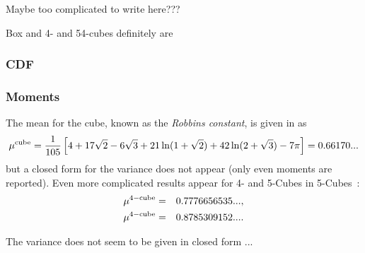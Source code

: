 Maybe too complicated to write here???

Box and 4- and 54-cubes definitely are


\subsubsection{CDF}


\subsubsection{Moments}

The mean for the cube, known as the {\em Robbins constant}, is given
in \cite{robbins78:_constant,weisstein:_cube_line_picking} as
\begin{equation}
   \label{eq:cube_mean}
 \mu^{\rm cube} = \frac{1}{105} \left[ 
                             4 + 17 \sqrt{2}- 6 \sqrt{3}  +
                             21 \ln(1+\sqrt{2}) + 
                             42 \ln(2+\sqrt{3}) - 7 \pi
                      \right]
	=	0.66170...
\end{equation}
but a closed form for the variance does not appear (only even moments
are reported). Even more complicated results appear for 4- and 5-Cubes in
5-Cubes~\cite{philip:_probab_distr_distan_between_two_4d}:
\begin{eqnarray}
 \mu^{\rm 4-cube} & = & 0.7776656535 ...    \label{eq:4-cube}, \\
 \mu^{\rm 4-cube} & = & 0.8785309152 ...     \label{eq:5-cube}.
\end{eqnarray}

The variance does not seem to be given in closed form ...

